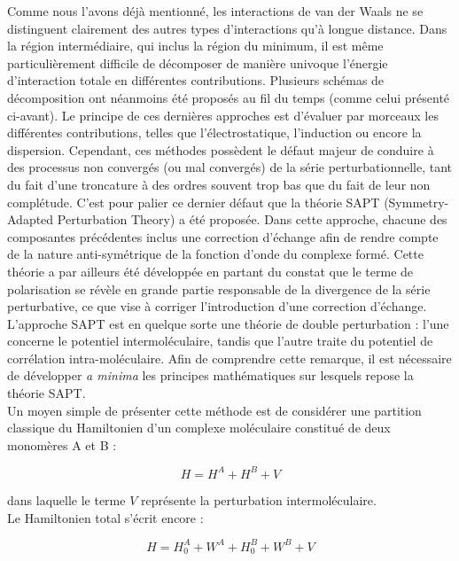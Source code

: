 	
	Comme nous l’avons déjà mentionné, les interactions de van der Waals ne se distinguent clairement des autres types d’interactions qu’à longue distance. Dans la région intermédiaire, qui inclus la région du minimum, il est même particulièrement difficile de décomposer de manière univoque l’énergie d'interaction totale en différentes contributions. Plusieurs schémas de décomposition ont néanmoins été proposés au fil du temps (comme celui présenté ci-avant). Le principe de ces dernières approches est d’évaluer par morceaux les différentes contributions, telles que l’électrostatique, l’induction ou encore la dispersion. Cependant, ces méthodes possèdent le défaut majeur de conduire à des processus non convergés (ou mal convergés) de la série perturbationnelle, tant du fait d'une troncature à des ordres souvent trop bas que du fait de leur non complétude. C’est pour palier ce dernier défaut que la théorie SAPT (Symmetry-Adapted Perturbation Theory) a été proposée. Dans cette approche, chacune des composantes précédentes inclus une correction d’échange afin de rendre compte de la nature anti-symétrique de la fonction d’onde du complexe formé. Cette théorie a par ailleurs été développée en partant du constat que le terme de polarisation se révèle en grande partie responsable de la divergence de la série perturbative, ce que vise à corriger l'introduction d'une correction d'échange. \\ 
		
	L’approche SAPT est en quelque sorte une théorie de double perturbation : l’une concerne le potentiel intermoléculaire, tandis que l’autre traite du potentiel de corrélation intra-moléculaire. Afin de comprendre cette remarque, il est nécessaire de développer \textit{a minima} les principes mathématiques sur lesquels repose la théorie SAPT.\\
	
	Un moyen simple de présenter cette méthode est de considérer une partition classique du Hamiltonien d'un complexe moléculaire constitué de deux monomères A et B :
	
	\begin{equation}
	H = H^{A} + H^{B} + V
	\end{equation}
	
	\noindent dans laquelle le terme $V$ représente la perturbation intermoléculaire.\\
	
	Le Hamiltonien total s'écrit encore :
	
	\begin{equation}
	H = H_{0}^{A} + W^{A} + H_{0}^{B} + W^{B} + V
	\end{equation}
	
